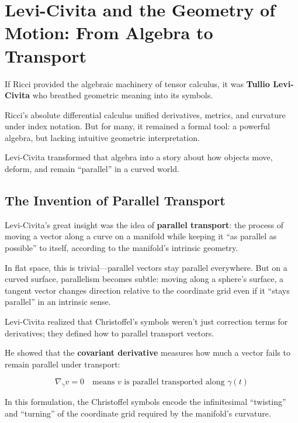 \section{Levi-Civita and the Geometry of Motion: From Algebra to Transport}

If Ricci provided the algebraic machinery of tensor calculus, it was \textbf{Tullio Levi-Civita} who breathed geometric meaning into its symbols.

Ricci’s absolute differential calculus unified derivatives, metrics, and curvature under index notation.  
But for many, it remained a formal tool: a powerful algebra, but lacking intuitive geometric interpretation.

Levi-Civita transformed that algebra into a story about how objects move, deform, and remain “parallel” in a curved world.

\bigskip

\subsection*{The Invention of Parallel Transport}

Levi-Civita’s great insight was the idea of \textbf{parallel transport}:  
the process of moving a vector along a curve on a manifold while keeping it “as parallel as possible” to itself, according to the manifold’s intrinsic geometry.

In flat space, this is trivial—parallel vectors stay parallel everywhere.  
But on a curved surface, parallelism becomes subtle: moving along a sphere’s surface, a tangent vector changes direction relative to the coordinate grid even if it “stays parallel” in an intrinsic sense.

Levi-Civita realized that Christoffel’s symbols weren’t just correction terms for derivatives;  
they defined how to parallel transport vectors.

He showed that the \textbf{covariant derivative} measures how much a vector fails to remain parallel under transport:

\[
\nabla_{\dot{\gamma}} v = 0
\quad \text{means } v \text{ is parallel transported along } \gamma(t)
\]

In this formulation, the Christoffel symbols encode the infinitesimal “twisting” and “turning” of the coordinate grid required by the manifold’s curvature.

\bigskip

